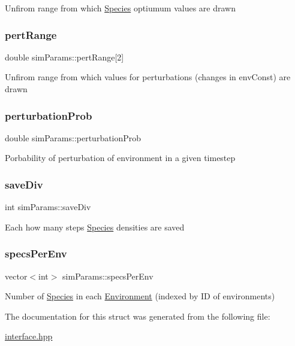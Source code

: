 Unfirom range from which \hyperlink{classSpecies}{Species} optiumum values are drawn \mbox{\label{structsimParams_a9b9d328e41381a83004b5fa062248fc7}} 
\subsubsection{\texorpdfstring{pert\+Range}{pertRange}}
{\footnotesize\ttfamily double sim\+Params\+::pert\+Range\mbox{[}2\mbox{]}}

Unfirom range from which values for perturbations (changes in env\+Const) are drawn \mbox{\label{structsimParams_aa07ddc0d55d057a586dc98ffd113e064}} 
\subsubsection{\texorpdfstring{perturbation\+Prob}{perturbationProb}}
{\footnotesize\ttfamily double sim\+Params\+::perturbation\+Prob}

Porbability of perturbation of environment in a given timestep \mbox{\label{structsimParams_ad9fb5fcc3890d022270dbe00ec3a7c1e}} 
\subsubsection{\texorpdfstring{save\+Div}{saveDiv}}
{\footnotesize\ttfamily int sim\+Params\+::save\+Div}

Each how many steps \hyperlink{classSpecies}{Species} densities are saved \mbox{\label{structsimParams_aede5150c0b33bacae326638341a4e906}} 
\subsubsection{\texorpdfstring{specs\+Per\+Env}{specsPerEnv}}
{\footnotesize\ttfamily vector$<$int$>$ sim\+Params\+::specs\+Per\+Env}

Number of \hyperlink{classSpecies}{Species} in each \hyperlink{classEnvironment}{Environment} (indexed by ID of environments) 

The documentation for this struct was generated from the following file\+:\begin{DoxyCompactItemize}
\item 
\hyperlink{interface_8hpp}{interface.\+hpp}\end{DoxyCompactItemize}

